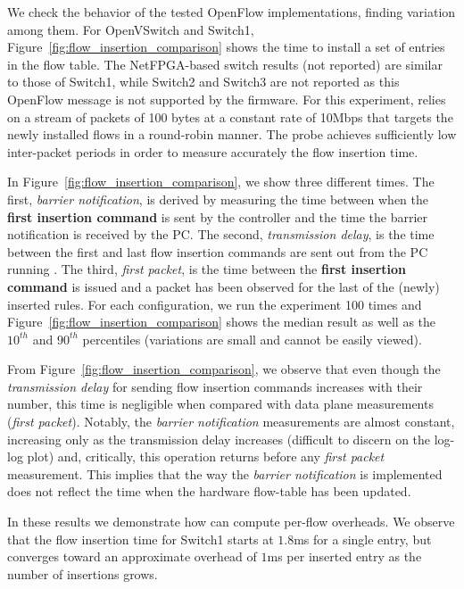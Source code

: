 We check the behavior of the tested OpenFlow implementations,
finding variation among them. For OpenVSwitch and Switch1,
Figure~\ref{fig:flow_insertion_comparison} shows the time to install a
set of entries in the flow table. The NetFPGA-based switch results
(not reported) are similar to those of Switch1, while Switch2 and Switch3 
are not reported as this OpenFlow message is not supported by the firmware. 
For this experiment, \oflops relies on a stream of packets of 100 bytes at
a constant rate of 10Mbps that targets the newly installed flows in a
round-robin manner. The probe achieves sufficiently low inter-packet
periods in order to measure accurately the flow insertion time.

In Figure~\ref{fig:flow_insertion_comparison}, we show three different
times. The first, {\it barrier notification}, is derived by measuring the time 
between when the \textbf{first insertion command} is sent by the \oflops 
controller and the time the barrier notification is received by the PC. The 
second, {\it transmission delay}, is the time between the first and 
last flow insertion commands are sent out from the PC running \oflops. 
The third, {\it first packet}, is the time between the \textbf{first insertion
 command} is issued and a packet has been observed for the last of
the (newly) inserted rules. For each configuration, we run the
experiment 100 times and Figure~\ref{fig:flow_insertion_comparison}
shows the median result as well as the $10^{th}$ and $90^{th}$ percentiles 
(variations are small and cannot be easily viewed).

From Figure~\ref{fig:flow_insertion_comparison}, we observe that even
though the {\it transmission delay} for sending flow insertion commands 
increases with their number, this time is negligible when compared with 
data plane measurements ({\it first packet}). Notably, the {\it barrier notification} 
measurements are almost constant, increasing only as the transmission delay 
increases (difficult to discern on the log-log plot) and, critically, this operation 
returns before any {\it first packet} measurement. This implies that the way
the {\it barrier notification} is implemented does not reflect the time when 
the hardware flow-table has been updated.

In these results we demonstrate how \oflops can compute per-flow
overheads. We observe that the flow insertion time for Switch1
starts at $1.8$ms for a single entry, but converges toward an
approximate overhead of $1$ms per inserted entry as the number of
insertions grows.

